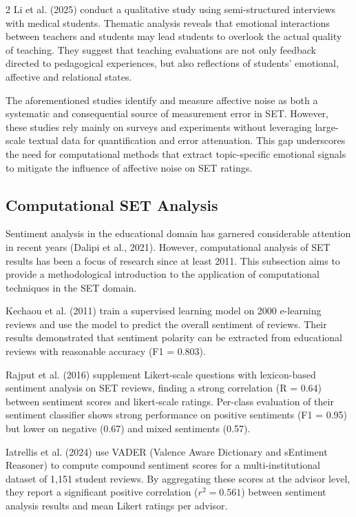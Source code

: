 \documentclass{article}
\begin{document}
\begin{multicols*}{2}
Li et al. (2025) conduct a qualitative study using semi-structured interviews with medical students. Thematic analysis reveals that emotional interactions between teachers and students may lead students to overlook the actual quality of teaching. They suggest that teaching evaluations are not only feedback directed to pedagogical experiences, but also reflections of students’ emotional, affective and relational states.

The aforementioned studies identify and measure affective noise as both a systematic and consequential source of measurement error in SET. However, these studies rely mainly on surveys and experiments without leveraging large-scale textual data for quantification and error attenuation. This gap underscores the need for computational methods that extract topic-specific emotional signals to mitigate the influence of affective noise on SET ratings.

\subsection{Computational SET Analysis}
Sentiment analysis in the educational domain has garnered considerable attention in recent years (Dalipi et al., 2021). However, computational analysis of SET results has been a focus of research since at least 2011. This subsection aims to provide a methodological introduction to the application of computational techniques in the SET domain.

Kechaou et al. (2011) train a supervised learning model on 2000 e-learning reviews and use the model to predict the overall sentiment of reviews. Their results demonstrated that sentiment polarity can be extracted from educational reviews with reasonable accuracy (F1 = 0.803).

Rajput et al. (2016) supplement Likert-scale questions with lexicon-based sentiment analysis on SET reviews, finding a strong correlation (R = 0.64) between sentiment scores and likert-scale ratings. Per-class evaluation of their sentiment classifier shows strong performance on positive sentiments (F1 = 0.95) but lower on negative (0.67) and mixed sentiments (0.57).

Iatrellis et al. (2024) use VADER (Valence Aware Dictionary and sEntiment Reasoner) to compute compound sentiment scores for a multi-institutional dataset of 1,151 student reviews. By aggregating these scores at the advisor level, they report a significant positive correlation ($r^2 = 0.561$) between sentiment analysis results and mean Likert ratings per advisor.


\end{multicols*}
\end{document}
